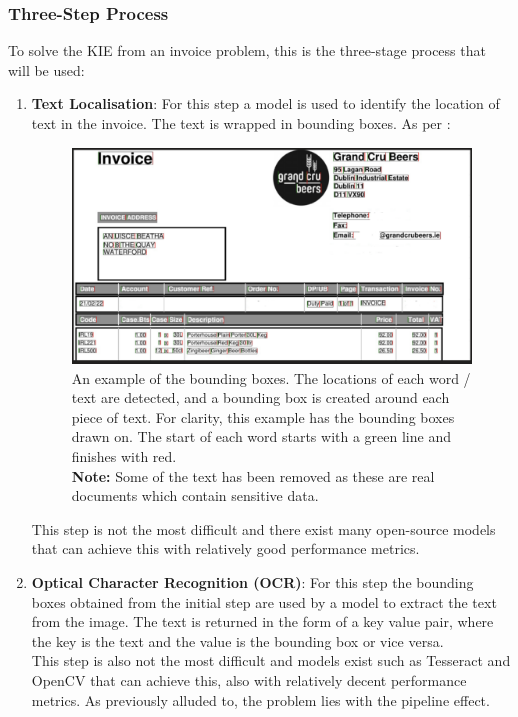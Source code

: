 \subsubsection{Three-Step Process}
To solve the KIE from an invoice problem, this is the three-stage process that will be used:
\begin{enumerate}
	\item \textbf{Text Localisation}: For this step a model is used to identify the location of text in the invoice. The text is
	      wrapped in bounding boxes. As per :
	      \begin{figure}[H]
		      \centering
		      \includegraphics[width=0.8\linewidth]{figures/bounding_box_partial.png}
		      \caption[Bounding Box Example]{An example of the bounding boxes. The locations of each word / text are detected, and a bounding box is created
			      around each piece of text. For clarity, this example has the bounding boxes drawn on. The start of each word starts with a green line and finishes with red.\\
			      \textbf{Note:} Some of the text has been removed as these are real documents which contain sensitive data.}
		      \label{fig:bounding_box_partial}
	      \end{figure}
	      This step is not the most difficult and there exist many open-source models that can achieve this with relatively good performance metrics.
	\item \textbf{Optical Character Recognition (OCR)}: For this step the bounding boxes obtained from the initial step are used by a model to extract
	      the text from the image. The text is returned in the form of a key value pair, where the key is the text and the value is the bounding box or vice versa.\\
	      This step is also not the most difficult and models exist such as Tesseract and OpenCV that can achieve this, also with relatively decent performance
	      metrics. As previously alluded to, the problem lies with the pipeline effect.

\end{enumerate}
